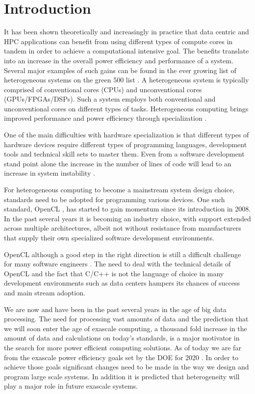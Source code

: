 \documentclass[runningheads,a4paper]{llncs}
\begin{document}
\section{Introduction}
It has been shown theoretically \cite{Chung:2010} and increasingly in practice that data centric \cite{Chalamalasetti:2012} and HPC \cite{Gan:2013} applications can benefit from using different types of compute cores in tandem in order to achieve a computational intensive goal. The benefits translate into an increase in the overall power efficiency and performance of a system. Several major examples of such gains can be found in the ever growing list of heterogeneous systems on the green 500 list \cite{green500:2014}. A heterogeneous system is typically comprised of conventional cores (CPUs) and unconventional cores (GPUs/FPGAs/DSPs). Such a system employs both conventional and unconventional cores on different types of tasks. Heterogeneous computing brings improved performance and power efficiency through specialization \cite{Huang:2009}.

One of the main difficulties with hardware specialization is that different types of hardware devices require different types of programming languages, development tools and technical skill sets to master them. Even from a software development stand point alone the increase in the number of lines of code will lead to an increase in system instability \cite{McConnell:1993}.

For heterogeneous computing to become a mainstream system design choice, standards need to be adopted for programming various devices. One such standard, OpenCL \cite{opencl:2011}, has started to gain momentum since its introduction in 2008. In the past several years it is becoming an industry choice, with support extended across multiple architectures, albeit not without resistance from manufacturers that supply their own specialized software development environments.

OpenCL although a good step in the right direction is still a difficult challenge for many software engineers \cite{tiode:2015}. The need to deal with the technical details of OpenCL and the fact that C/C++ is not the language of choice in many development environments such as data centers hampers its chances of success and main stream adoption.

We are now and have been in the past several years in the age of big data processing. The need for processing vast amounts of data and the prediction that we will soon enter the age of exascale computing, a thousand fold increase in the amount of data and calculations on today’s standards, is a major motivator in the search for more power efficient computing solutions. As of today we are far from the exascale power efficiency goals set by the DOE for 2020 \cite{Shalf:2010}. In order to achieve those goals significant changes need to be made in the way we design and program large scale systems. In addition it is predicted \cite{Dongarra:2011} that heterogeneity will play a major role in future exascale systems.
\end{document}
